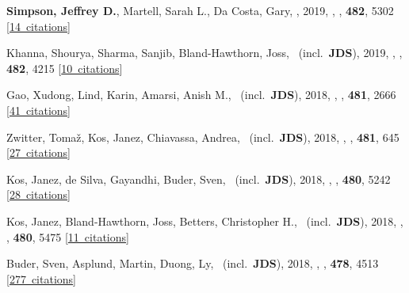 \item[{\color{numcolor}\scriptsize25}] \textbf{Simpson, Jeffrey D.}, Martell, Sarah L., Da Costa, Gary, \etal, 2019, , \mnras, \textbf{482}, 5302 [\href{https://ui.adsabs.harvard.edu/#abs/2019MNRAS.482.5302S}{14~citations}]

\item[{\color{numcolor}\scriptsize24}] Khanna, Shourya, Sharma, Sanjib, Bland-Hawthorn, Joss, \etal\ (incl.\ \textbf{JDS}), 2019, , \mnras, \textbf{482}, 4215 [\href{https://ui.adsabs.harvard.edu/#abs/2019MNRAS.482.4215K}{10~citations}]

\item[{\color{numcolor}\scriptsize23}] Gao, Xudong, Lind, Karin, Amarsi, Anish M., \etal\ (incl.\ \textbf{JDS}), 2018, , \mnras, \textbf{481}, 2666 [\href{https://ui.adsabs.harvard.edu/#abs/2018MNRAS.481.2666G}{41~citations}]

\item[{\color{numcolor}\scriptsize22}] Zwitter, Toma{\v{z}}, Kos, Janez, Chiavassa, Andrea, \etal\ (incl.\ \textbf{JDS}), 2018, , \mnras, \textbf{481}, 645 [\href{https://ui.adsabs.harvard.edu/#abs/2018MNRAS.481..645Z}{27~citations}]

\item[{\color{numcolor}\scriptsize21}] Kos, Janez, de Silva, Gayandhi, Buder, Sven, \etal\ (incl.\ \textbf{JDS}), 2018, , \mnras, \textbf{480}, 5242 [\href{https://ui.adsabs.harvard.edu/#abs/2018MNRAS.480.5242K}{28~citations}]

\item[{\color{numcolor}\scriptsize20}] Kos, Janez, Bland-Hawthorn, Joss, Betters, Christopher H., \etal\ (incl.\ \textbf{JDS}), 2018, , \mnras, \textbf{480}, 5475 [\href{https://ui.adsabs.harvard.edu/#abs/2018MNRAS.480.5475K}{11~citations}]

\item[{\color{numcolor}\scriptsize19}] Buder, Sven, Asplund, Martin, Duong, Ly, \etal\ (incl.\ \textbf{JDS}), 2018, , \mnras, \textbf{478}, 4513 [\href{https://ui.adsabs.harvard.edu/#abs/2018MNRAS.478.4513B}{277~citations}]

